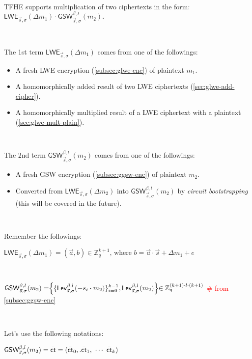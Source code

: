 $ $

TFHE supports multiplication of two ciphertexts in the form: $\textsf{LWE}_{\vec{s}, \sigma}(\Delta m_1) \cdot \textsf{GSW}_{\vec{s}, \sigma}^{\beta, l}(m_2)$. 

$ $

\noindent The 1st term $\textsf{LWE}_{\vec{s}, \sigma}(\Delta m_1)$ comes from one of the followings: 
\begin{itemize}
\item A fresh LWE encryption (\autoref{subsec:glwe-enc}) of plaintext $m_1$. 
\item A homomorphically added result of two LWE ciphertexts (\autoref{sec:glwe-add-cipher}). 
\item A homomorphically multiplied result of a LWE ciphertext with a plaintext (\autoref{sec:glwe-mult-plain}). 
\end{itemize}

$ $

\noindent The 2nd term $\textsf{GSW}_{\vec{s}, \sigma}^{\beta, l}(m_2)$ comes from one of the followings:
\begin{itemize}
\item A fresh GSW encryption (\autoref{subsec:ggsw-enc}) of plaintext $m_2$.
\item Converted from $\textsf{LWE}_{\vec{s}, \sigma}(\Delta m_2)$ into $\textsf{GSW}_{\vec{s}, \sigma}^{\beta, l}(m_2)$ by \textit{circuit bootstrapping} (this will be covered in the future).
\end{itemize}

$ $

\noindent Remember the followings: 

$\textsf{LWE}_{\vec{s}, \sigma}(\Delta m_1) = (\vec{a}, b) \in \mathbb{Z}_{q}^{k + 1}$, where $b = \vec{a} \cdot \vec{s} + \Delta m_1 + e$ 

$ $

$\textsf{GSW}_{\vec{s}, \sigma}^{\beta, l}(m_2) = \Bigr \{ \{ \textsf{Lev}_{\vec{s}, \sigma}^{\beta, l} (-s_i \cdot m_2)  \}_{i=0}^{k-1}, \textsf{Lev}_{\vec{s}, \sigma}^{\beta, l}(m_2) \Bigl \} \in \mathbb{Z}_{q }^{(k+1) \cdot l \cdot (k+1)}$ \textcolor{red}{\# from \autoref{subsec:ggsw-enc}}

$ $

\noindent Let's use the following notations:

$\textsf{GSW}_{\vec{s}, \sigma}^{\beta, l}(m_2) = {\bar{\textsf{ct}}} = (\bar{\textsf{ct}}_0,. \bar{\textsf{ct}}_1, \text{ } \text{$\cdots$} \text{ } \bar{\textsf{ct}}_k)$ 

